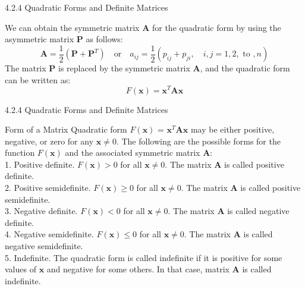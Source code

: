 \documentclass[aspectratio=169,xcolor=dvipsnames]{beamer}
\begin{document}
\begin{frame}{4.2.4 Quadratic Forms and Definite Matrices}

We can obtain the symmetric matrix $\mathbf{A}$ for the quadratic form by using the asymmetric matrix $\mathbf{P}$ as follows:
\begin{equation*}
    \mathbf{A} = \frac{1}{2}(\mathbf{P} + \mathbf{P}^T) \quad \text{or} \quad a_{ij} = \frac{1}{2}(p_{ij} + p_{ji}, \quad i, j = 1, 2, \text{ to }, n)
\end{equation*}
The matrix $\mathbf{P}$ is replaced by the symmetric matrix $\mathbf{A}$, and the quadratic form can be written as:
\begin{equation*}
    F(\mathbf{x}) = \mathbf{x}^T \mathbf{A} \mathbf{x}
\end{equation*}

\end{frame}

\begin{frame}{4.2.4 Quadratic Forms and Definite Matrices}

\begin{block}{Form of a Matrix}
    Quadratic form $F(\mathbf{x})$ = $\mathbf{x}^T \mathbf{A} \mathbf{x}$ may be either positive, negative, or zero for any $\mathbf{x} \neq 0$.
    The following are the possible forms for the function $F(\mathbf{x})$ and the associated symmetric matrix $\mathbf{A}$: \\
    1. Positive definite. $F(\mathbf{x}) > 0$ for all $\mathbf{x} \neq 0$. The matrix $\mathbf{A}$ is called positive definite. \\
    2. Positive semidefinite. $F(\mathbf{x}) \geq 0$ for all $\mathbf{x} \neq 0$. The matrix $\mathbf{A}$ is called positive semidefinite. \\
    3. Negative definite. $F(\mathbf{x}) < 0$ for all $\mathbf{x} \neq 0$. The matrix $\mathbf{A}$ is called negative definite. \\
    4. Negative semidefinite. $F(\mathbf{x}) \leq 0$ for all $\mathbf{x} \neq 0$. The matrix $\mathbf{A}$ is called negative semidefinite. \\
    5. Indefinite. The quadratic form is called indefinite if it is positive for some values of $\mathbf{x}$ and negative for some others. 
    In that case, matrix $\mathbf{A}$ is called indefinite.
\end{block}

\end{frame}
\end{document}
